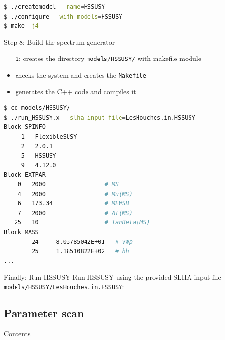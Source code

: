 \documentclass[hyperref={pdfpagelabels=false},ngerman]{beamer}
\begin{document}
\begin{lrbox}{\listbox}\begin{lstlisting}[language=bash]
$ ./createmodel --name=HSSUSY
$ ./configure --with-models=HSSUSY
$ make -j4
\end{lstlisting}\end{lrbox} %

\begin{frame}{Step 8: Build the spectrum generator}
  \usebox{\listbox}
  \\[1em]
  \begin{itemize}
  \item[\texttt{1}:] creates the directory \lstinline{models/HSSUSY/}
    with makefile module
  \item[\texttt{2}:] checks the system and creates the \lstinline{Makefile}
  \item[\texttt{3}:] generates the C++ code and compiles it
  \end{itemize}
\end{frame}

\begin{lrbox}{\listbox}\begin{lstlisting}[language=bash]
$ cd models/HSSUSY/
$ ./run_HSSUSY.x --slha-input-file=LesHouches.in.HSSUSY
Block SPINFO
     1   FlexibleSUSY
     2   2.0.1
     5   HSSUSY
     9   4.12.0
Block EXTPAR
    0   2000                 # MS
    4   2000                 # Mu(MS)
    6   173.34               # MEWSB
    7   2000                 # At(MS)
   25   10                   # TanBeta(MS)
Block MASS
        24     8.03785042E+01   # VWp
        25     1.18510822E+02   # hh
...
\end{lstlisting}\end{lrbox} %

\begin{frame}{Finally: Run HSSUSY}
  Run HSSUSY using the provided SLHA input file
  \lstinline{models/HSSUSY/LesHouches.in.HSSUSY}:\\[2em]
  \usebox{\listbox}
\end{frame}

\subsection{Parameter scan}

\begin{frame}{Contents}
  \tableofcontents[currentsubsection,sectionstyle=show/shaded]  
\end{frame}
\end{document}
